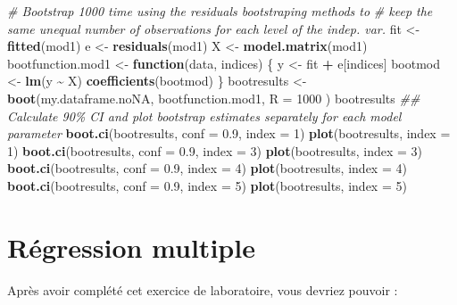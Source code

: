 \documentclass[
  12pt,
]{book}
\newenvironment{Shaded}{\begin{snugshade}}{\end{snugshade}}
\newcommand{\CommentTok}[1]{\textcolor[rgb]{0.56,0.35,0.01}{\textit{#1}}}
\newcommand{\ControlFlowTok}[1]{\textcolor[rgb]{0.13,0.29,0.53}{\textbf{#1}}}
\newcommand{\DataTypeTok}[1]{\textcolor[rgb]{0.13,0.29,0.53}{#1}}
\newcommand{\DecValTok}[1]{\textcolor[rgb]{0.00,0.00,0.81}{#1}}
\newcommand{\FloatTok}[1]{\textcolor[rgb]{0.00,0.00,0.81}{#1}}
\newcommand{\KeywordTok}[1]{\textcolor[rgb]{0.13,0.29,0.53}{\textbf{#1}}}
\newcommand{\NormalTok}[1]{#1}
\newcommand{\OperatorTok}[1]{\textcolor[rgb]{0.81,0.36,0.00}{\textbf{#1}}}
\newcommand{\StringTok}[1]{\textcolor[rgb]{0.31,0.60,0.02}{#1}}
\begin{document}
\begin{Shaded}
\begin{Highlighting}[]
\CommentTok{\# Bootstrap 1000 time using the residuals bootstraping methods to}
\CommentTok{\# keep the same unequal number of observations for each level of the indep. var.}
\NormalTok{fit \textless{}{-}}\StringTok{ }\KeywordTok{fitted}\NormalTok{(mod1)}
\NormalTok{e \textless{}{-}}\StringTok{ }\KeywordTok{residuals}\NormalTok{(mod1)}
\NormalTok{X \textless{}{-}}\StringTok{ }\KeywordTok{model.matrix}\NormalTok{(mod1)}
\NormalTok{bootfunction.mod1 \textless{}{-}}\StringTok{ }\ControlFlowTok{function}\NormalTok{(data, indices) \{}
\NormalTok{  y \textless{}{-}}\StringTok{ }\NormalTok{fit }\OperatorTok{+}\StringTok{ }\NormalTok{e[indices]}
\NormalTok{  bootmod \textless{}{-}}\StringTok{ }\KeywordTok{lm}\NormalTok{(y }\OperatorTok{\textasciitilde{}}\StringTok{ }\NormalTok{X)}
  \KeywordTok{coefficients}\NormalTok{(bootmod)}
\NormalTok{\}}
\NormalTok{bootresults \textless{}{-}}\StringTok{ }\KeywordTok{boot}\NormalTok{(my.dataframe.noNA, bootfunction.mod1,}
  \DataTypeTok{R =} \DecValTok{1000}
\NormalTok{)}
\NormalTok{bootresults}
\CommentTok{\#\# Calculate 90\% CI and plot bootstrap estimates separately for each model parameter}
\KeywordTok{boot.ci}\NormalTok{(bootresults, }\DataTypeTok{conf =} \FloatTok{0.9}\NormalTok{, }\DataTypeTok{index =} \DecValTok{1}\NormalTok{)}
\KeywordTok{plot}\NormalTok{(bootresults, }\DataTypeTok{index =} \DecValTok{1}\NormalTok{)}
\KeywordTok{boot.ci}\NormalTok{(bootresults, }\DataTypeTok{conf =} \FloatTok{0.9}\NormalTok{, }\DataTypeTok{index =} \DecValTok{3}\NormalTok{)}
\KeywordTok{plot}\NormalTok{(bootresults, }\DataTypeTok{index =} \DecValTok{3}\NormalTok{)}
\KeywordTok{boot.ci}\NormalTok{(bootresults, }\DataTypeTok{conf =} \FloatTok{0.9}\NormalTok{, }\DataTypeTok{index =} \DecValTok{4}\NormalTok{)}
\KeywordTok{plot}\NormalTok{(bootresults, }\DataTypeTok{index =} \DecValTok{4}\NormalTok{)}
\KeywordTok{boot.ci}\NormalTok{(bootresults, }\DataTypeTok{conf =} \FloatTok{0.9}\NormalTok{, }\DataTypeTok{index =} \DecValTok{5}\NormalTok{)}
\KeywordTok{plot}\NormalTok{(bootresults, }\DataTypeTok{index =} \DecValTok{5}\NormalTok{)}
\end{Highlighting}
\end{Shaded}

\hypertarget{ruxe9gression-multiple}{%
\chapter{Régression multiple}\label{ruxe9gression-multiple}}

Après avoir complété cet exercice de laboratoire, vous devriez pouvoir :
\end{document}
